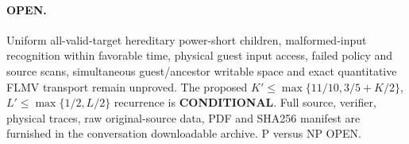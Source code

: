 \documentclass{article}
\begin{document}
\paragraph{OPEN.} Uniform all-valid-target hereditary power-short children, malformed-input recognition within favorable time, physical guest input access, failed policy and source scans, simultaneous guest/ancestor writable space and exact quantitative FLMV transport remain unproved. The proposed $K'\le\max\{11/10,3/5+K/2\}$, $L'\le\max\{1/2,L/2\}$ recurrence is \textbf{CONDITIONAL}. Full source, verifier, physical traces, raw original-source data, PDF and SHA256 manifest are furnished in the conversation downloadable archive. P versus NP OPEN.
\end{document}
